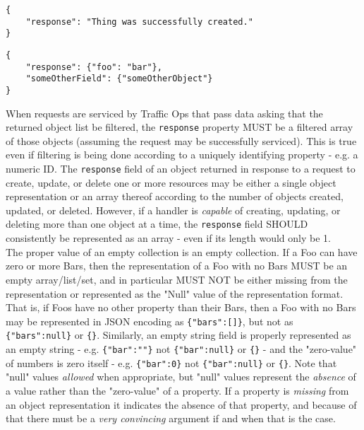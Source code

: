 \documentclass{article}
\newenvironment{codelisting}{\captionsetup{type=listing}}{}
\newcommand{\code}[1]{\texttt{\color{inlinecodecolor}#1}}
\begin{document}
\begin{codelisting}
\label{code:badresponseexample:success-as-response}
\begin{verbatim}
{
	"response": "Thing was successfully created."
}
\end{verbatim}
\end{codelisting}

\begin{codelisting}
\label{code:badresponseexample:extra-field}
\begin{verbatim}
{
	"response": {"foo": "bar"},
	"someOtherField": {"someOtherObject"}
}
\end{verbatim}
\end{codelisting}

When requests are serviced by Traffic Ops that pass data asking that the returned object list be filtered, the \code{response} property
MUST be a filtered array of those objects (assuming the request may be successfully serviced). This is true even if filtering is being
done according to a uniquely identifying property - e.g. a numeric ID. The \code{response} field of an object returned in response to a
request to create, update, or delete one or more resources may be either a single object representation or an array thereof according to
the number of objects created, updated, or deleted. However, if a handler is \emph{capable} of creating, updating, or deleting more than
one object at a time, the \code{response} field SHOULD consistently be represented as an array - even if its length would only be 1.\\
The proper value of an empty collection is an empty collection. If a Foo can have zero or more Bars, then the representation of a Foo with
no Bars MUST be an empty array/list/set, and in particular MUST NOT be either missing from the representation or represented as the "Null"
value of the representation format. That is, if Foos have no other property than their Bars, then a Foo with no Bars may be represented
in JSON encoding as \code{\{"bars":[]\}}, but not as \code{\{"bars":null\}} or \code{\{\}}. Similarly, an empty string field is properly
represented as an empty string - e.g. \code{\{"bar":""\}} not \code{\{"bar":null\}} or \code{\{\}} - and the "zero-value" of numbers is
zero itself - e.g. \code{\{"bar":0\}} not \code{\{"bar":null\}} or \code{\{\}}. Note that "null" values \emph{allowed} when appropriate,
but "null" values represent the \emph{absence} of a value rather than the "zero-value" of a property. If a property is \emph{missing}
from an object representation it indicates the absence of that property, and because of that there must be a \emph{very convincing}
argument if and when that is the case.
\end{document}

